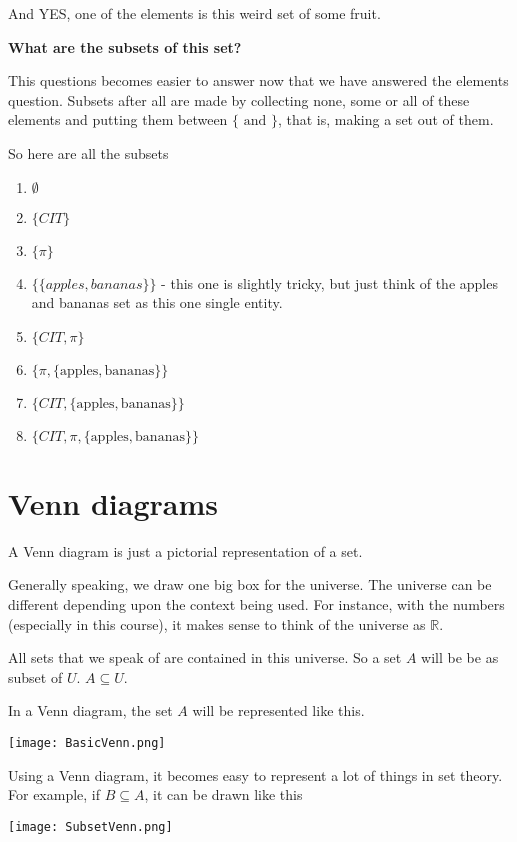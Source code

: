 \documentclass[12pt]{article}
\begin{document}
And YES, one of the elements is this weird set of some fruit.

\medskip

\textbf{What are the subsets of this set?}

This questions becomes easier to answer now that we have answered the elements question. Subsets after all are made by collecting none, some or all of these elements and putting them between $\{ \text{ and } \}$, that is, making a set out of them.

So here are all the subsets
\begin{enumerate}
\item $\emptyset$
\item $\{CIT\}$
\item $\{\pi\}$
\item $\{\{apples, bananas\}\}$ - this one is slightly tricky, but just think of the apples and bananas set as this one single entity.
\item $\{CIT, \pi\}$
\item $\{\pi, \{\text{apples}, \text{bananas} \} \}$
\item $\{CIT, \{\text{apples}, \text{bananas} \} \}$
\item $\{CIT, \pi , \{\text{apples}, \text{bananas} \} \}$
\end{enumerate}


\section*{Venn diagrams}

A Venn diagram is just a pictorial representation of a set.

Generally speaking, we draw one big box for the universe. The universe can be different depending upon the context being used. For instance, with the numbers (especially in this course), it makes sense to think of the universe as $\mathbb{R}$.

All sets that we speak of are contained in this universe. So a set $A$ will be 
be as subset of $U$. $ A \subseteq U$.

In a Venn diagram, the set $A$ will be represented like this.

\texttt{[image: BasicVenn.png]}

Using a Venn diagram, it becomes easy to represent a lot of things in set theory. For example, if $B \subseteq A$, it can be drawn like this

\texttt{[image: SubsetVenn.png]}
\end{document}
